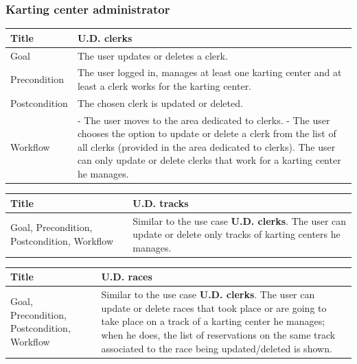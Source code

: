 \documentclass{beamer}
\begin{document}
\begin{frame}
    \frametitle{Karting center administrator}
    \begin{table}
        \tiny
        \begin{tabular}{|p{2cm}|p{6cm}|}
        \hline  
        Title & \textbf{U.D. clerks} \\
        \hline
        Goal & The user updates or deletes a clerk. \\
        \hline
        Precondition & The user logged in, manages at least one karting
        center and at least a clerk works for the karting center. \\
        \hline
        Postcondition & The chosen clerk is updated or deleted. \\
        \hline
        Workflow &
        - The user moves to the area dedicated to clerks. \newline
        - The user chooses the option to update or delete a clerk from
        the list of all clerks (provided in the area dedicated to clerks). 
        The user can only update or delete clerks that work for a karting center he manages.\\
        \hline
        \end{tabular}
\end{table}

\begin{table}
    \tiny
    \begin{tabular}{|p{2cm}|p{6cm}|}
    \hline  
    Title & \textbf{U.D. tracks} \\
    \hline
    Goal, Precondition, Postcondition, Workflow & Similar to the use case \textbf{U.D. clerks}.
    The user can update or delete only tracks of karting centers he manages.\\
    \hline
    \end{tabular}
\end{table}

\begin{table}
    \tiny
    \begin{tabular}{|p{2cm}|p{6cm}|}
    \hline  
    Title & \textbf{U.D. races} \\
    \hline
    Goal, Precondition, Postcondition, Workflow & Similar to the use case \textbf{U.D. clerks}.
    The user can update or delete races that took place or are going to take place on a track 
    of a karting center he manages; when he does, the list of reservations on the same track 
    associated to the race being updated/deleted is shown.\\
    \hline
    \end{tabular}
\end{table}
\end{frame}
\end{document}
